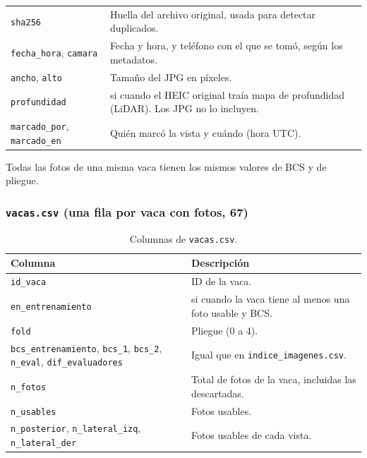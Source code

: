 \begin{table}[H]
\begin{tabularx}{\textwidth}{>{\raggedright\arraybackslash}p{}>{\raggedright\arraybackslash}X}
    \texttt{sha256} & Huella del archivo original, usada para detectar duplicados. \\
    \texttt{fecha\_hora}, \texttt{camara} & Fecha y hora, y teléfono con el que se tomó, según los metadatos. \\
    \texttt{ancho}, \texttt{alto} & Tamaño del JPG en píxeles. \\
    \texttt{profundidad} & si cuando el HEIC original traía mapa de profundidad (LiDAR). Los JPG no lo incluyen. \\
    \texttt{marcado\_por}, \texttt{marcado\_en} & Quién marcó la vista y cuándo (hora UTC). \\
    \bottomrule
  \end{tabularx}
\end{table}

Todas las fotos de una misma vaca tienen los mismos valores de BCS y de pliegue.

\subsubsection*{\texttt{vacas.csv} (una fila por vaca con fotos, 67)}

\begin{table}[H]
  \centering
  \small
  \caption{Columnas de \texttt{vacas.csv}.}
  \label{tab:col-vacas}
  \begin{tabularx}{\textwidth}{>{\raggedright\arraybackslash}p{}>{\raggedright\arraybackslash}X}
    \toprule
    Columna & Descripción \\
    \midrule
    \texttt{id\_vaca} & ID de la vaca. \\
    \texttt{en\_entrenamiento} & si cuando la vaca tiene al menos una foto usable y BCS. \\
    \texttt{fold} & Pliegue (0 a 4). \\
    \texttt{bcs\_entrenamiento}, \texttt{bcs\_1}, \texttt{bcs\_2}, \texttt{n\_eval}, \texttt{dif\_evaluadores} & Igual que en \texttt{indice\_imagenes.csv}. \\
    \texttt{n\_fotos} & Total de fotos de la vaca, incluidas las descartadas. \\
    \texttt{n\_usables} & Fotos usables. \\
    \texttt{n\_posterior}, \texttt{n\_lateral\_izq}, \texttt{n\_lateral\_der} & Fotos usables de cada vista. \\
    \bottomrule
  \end{tabularx}
\end{table}

